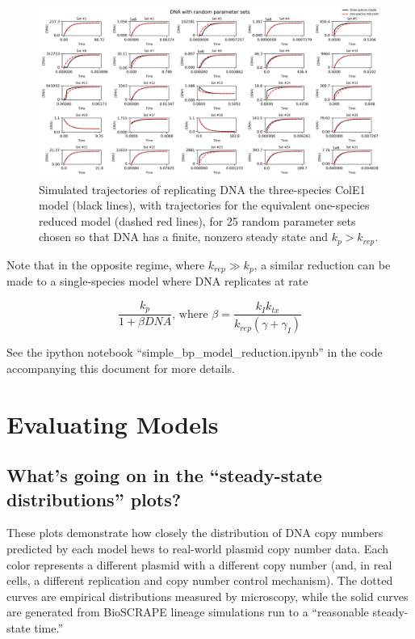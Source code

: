 \documentclass[preprint,12pt]{oldplainarticle}
\begin{document}
\begin{figure}[!ht]
\centering
\includegraphics[scale=.35]{figures/model_reduction_examples.png}
\caption{Simulated trajectories of replicating DNA the three-species ColE1 model (black lines), with trajectories for the equivalent one-species reduced model (dashed red lines), for 25 random parameter sets chosen so that DNA has a finite, nonzero steady state and $k_p > k_{rep}$. }
\label{fig:model_reduction_examples}
\end{figure}

Note that in the opposite regime, where $k_{rep} \gg k_p$, a similar reduction can be made to a single-species model where DNA replicates at rate

$$\frac{k_p}{1 + \beta DNA}\text{, where } \beta = \frac{k_I k_{tx}}{k_{rep}(\gamma + \gamma_I)}$$

See the ipython notebook ``simple\_bp\_model\_reduction.ipynb'' in the code accompanying this document for more details.
\section{Evaluating Models}\label{S:evaluation}

\subsection{What's going on in the ``steady-state distributions'' plots?}

These plots demonstrate how closely the distribution of DNA copy numbers predicted by each model hews to real-world plasmid copy number data. Each color represents a different plasmid with a different copy number (and, in real cells, a different replication and copy number control mechanism). The dotted curves are empirical distributions measured by microscopy, while the solid curves are generated from BioSCRAPE lineage simulations run to a ``reasonable steady-state time.''
\end{document}
